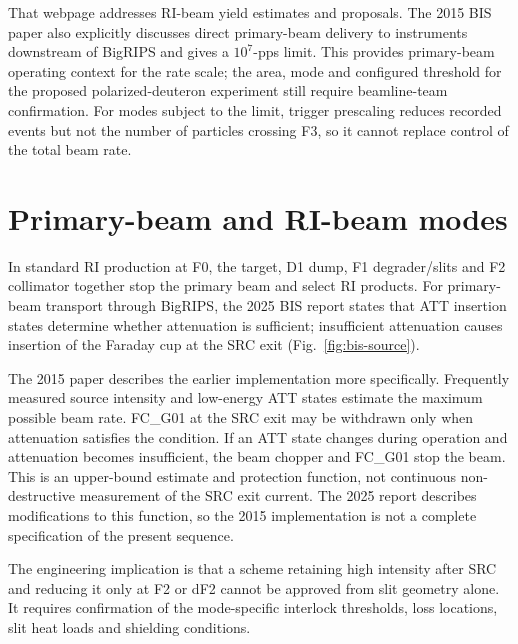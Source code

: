 \documentclass[11pt,a4paper]{article}
\begin{document}
That webpage addresses RI-beam yield estimates and proposals. The 2015 BIS paper also explicitly discusses direct primary-beam delivery to instruments downstream of BigRIPS and gives a $10^7$-pps limit.\cite{bis2015} This provides primary-beam operating context for the rate scale; the area, mode and configured threshold for the proposed polarized-deuteron experiment still require beamline-team confirmation. For modes subject to the limit, trigger prescaling reduces recorded events but not the number of particles crossing F3, so it cannot replace control of the total beam rate.

\section{Primary-beam and RI-beam modes}
In standard RI production at F0, the target, D1 dump, F1 degrader/slits and F2 collimator together stop the primary beam and select RI products.\cite{bigrips-config,bigrips-focal} For primary-beam transport through BigRIPS, the 2025 BIS report states that ATT insertion states determine whether attenuation is sufficient; insufficient attenuation causes insertion of the Faraday cup at the SRC exit (Fig.~\ref{fig:bis-source}).\cite{bis}

The 2015 paper describes the earlier implementation more specifically. Frequently measured source intensity and low-energy ATT states estimate the maximum possible beam rate. FC\_G01 at the SRC exit may be withdrawn only when attenuation satisfies the condition. If an ATT state changes during operation and attenuation becomes insufficient, the beam chopper and FC\_G01 stop the beam.\cite{bis2015} This is an upper-bound estimate and protection function, not continuous non-destructive measurement of the SRC exit current. The 2025 report describes modifications to this function, so the 2015 implementation is not a complete specification of the present sequence.

The engineering implication is that a scheme retaining high intensity after SRC and reducing it only at F2 or dF2 cannot be approved from slit geometry alone. It requires confirmation of the mode-specific interlock thresholds, loss locations, slit heat loads and shielding conditions.
\end{document}
